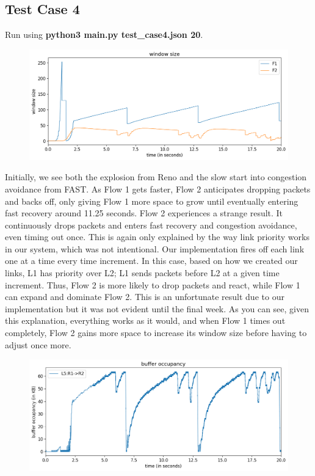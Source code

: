 \documentclass{article}
\begin{document}
\subsection{Test Case 4}

Run using \textbf{python3 main.py test\_case4.json 20}.

\begin{figure}[H]
\centering
\includegraphics[width = \textwidth]{test_case4 window size.png}
\end{figure}

Initially, we see both the explosion from Reno and the slow start into congestion avoidance from FAST. As Flow 1 gets faster, Flow 2 anticipates dropping packets and backs off, only giving Flow 1 more space to grow until eventually entering fast recovery around 11.25 seconds. Flow 2 experiences a strange result. It continuously drops packets and enters fast recovery and congestion avoidance, even timing out once. This is again only explained by the way link priority works in our system, which was not intentional. Our implementation fires off each link one at a time every time increment. In this case, based on how we created our links, L1 has priority over L2; L1 sends packets before L2 at a given time increment. Thus, Flow 2 is more likely to drop packets and react, while Flow 1 can expand and dominate Flow 2. This is an unfortunate result due to our implementation but it was not evident until the final week. As you can see, given this explanation, everything works as it would, and when Flow 1 times out completely, Flow 2 gains more space to increase its window size before having to adjust once more.

\begin{figure}[H]
\centering
\includegraphics[width = \textwidth]{test_case4 buffer occupancy.png}
\end{figure}
\end{document}

